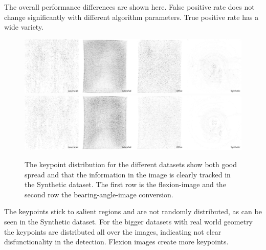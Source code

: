 The overall performance differences are shown here.
False positive rate does not change significantly with different algorithm parameters.
True positive rate has a wide variety.
\begin{figure}[H]
    \includegraphics[width=\linewidth]{chapter06/results/SIFT/flexion/distribution.pdf}\\
    \includegraphics[width=\linewidth]{chapter06/results/SIFT/bearing/distribution.pdf}%
    \caption{The keypoint distribution for the different datasets show both good spread and that the information in the image is clearly tracked in the Synthetic dataset. The first row is the \gls{flexion-image} and the second row the \gls{bearing-angle-image} conversion.}
\end{figure}
The keypoints stick to salient regions and are not randomly distributed, as can be seen in the Synthetic dataset.
For the bigger datasets with real world geometry the keypoints are distributed all over the images, indicating not clear disfunctionality in the detection.
Flexion images create more keypoints.
